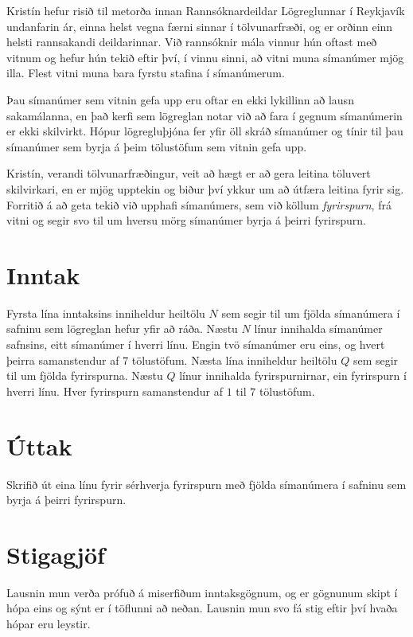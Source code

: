 Kristín hefur risið til metorða innan Rannsóknardeildar Lögreglunnar í
Reykjavík undanfarin ár, einna helst vegna færni sinnar í tölvunarfræði, og er
orðinn einn helsti rannsakandi deildarinnar. Við rannsóknir mála vinnur hún
oftast með vitnum og hefur hún tekið eftir því, í vinnu sinni, að vitni muna
símanúmer mjög illa. Flest vitni muna bara fyrstu stafina í símanúmerum.

Þau símanúmer sem vitnin gefa upp eru oftar en ekki lykillinn að lausn
sakamálanna, en það kerfi sem lögreglan notar við að fara í gegnum símanúmerin
er ekki skilvirkt. Hópur lögregluþjóna fer yfir öll skráð símanúmer og tínir
til þau símanúmer sem byrja á þeim tölustöfum sem vitnin gefa upp.

Kristín, verandi tölvunarfræðingur, veit að hægt er að gera leitina töluvert
skilvirkari, en er mjög upptekin og biður því ykkur um að útfæra leitina fyrir
sig. Forritið á að geta tekið við upphafi símanúmers, sem við köllum
\emph{fyrirspurn}, frá vitni og segir svo til um hversu mörg símanúmer byrja á
þeirri fyrirspurn.

\section*{Inntak}
Fyrsta lína inntaksins inniheldur heiltölu $N$ sem segir til um fjölda
símanúmera í safninu sem lögreglan hefur yfir að ráða. Næstu $N$ línur
innihalda símanúmer safnsins, eitt símanúmer í hverri línu. Engin tvö símanúmer
eru eins, og hvert þeirra samanstendur af $7$ tölustöfum. Næsta lína inniheldur
heiltölu $Q$ sem segir til um fjölda fyrirspurna. Næstu $Q$ línur innihalda
fyrirspurnirnar, ein fyrirspurn í hverri línu. Hver fyrirspurn samanstendur af
$1$ til $7$ tölustöfum.

\section*{Úttak}
Skrifið út eina línu fyrir sérhverja fyrirspurn með fjölda símanúmera í safninu
sem byrja á þeirri fyrirspurn.

\section*{Stigagjöf}
Lausnin mun verða prófuð á miserfiðum inntaksgögnum, og er gögnunum skipt í
hópa eins og sýnt er í töflunni að neðan. Lausnin mun svo fá stig eftir því
hvaða hópar eru leystir.

